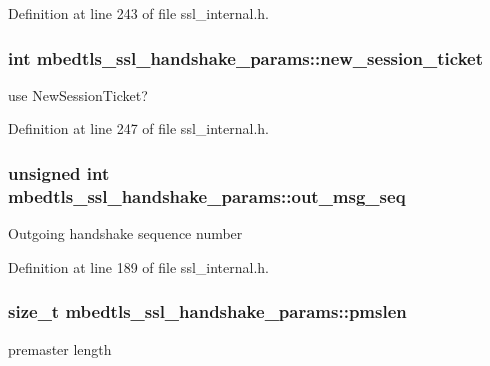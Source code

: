 Definition at line 243 of file ssl\-\_\-internal.\-h.

\hypertarget{structmbedtls__ssl__handshake__params_a576d0c2cbfd8b226f9def975403376ce}{
\subsubsection[{new\-\_\-session\-\_\-ticket}]{\setlength{\rightskip}{0pt plus 5cm}int mbedtls\-\_\-ssl\-\_\-handshake\-\_\-params\-::new\-\_\-session\-\_\-ticket}}\label{structmbedtls__ssl__handshake__params_a576d0c2cbfd8b226f9def975403376ce}
use New\-Session\-Ticket? 

Definition at line 247 of file ssl\-\_\-internal.\-h.

\hypertarget{structmbedtls__ssl__handshake__params_a5dd64f971dd0b4b43828e264117304d0}{
\subsubsection[{out\-\_\-msg\-\_\-seq}]{\setlength{\rightskip}{0pt plus 5cm}unsigned int mbedtls\-\_\-ssl\-\_\-handshake\-\_\-params\-::out\-\_\-msg\-\_\-seq}}\label{structmbedtls__ssl__handshake__params_a5dd64f971dd0b4b43828e264117304d0}
Outgoing handshake sequence number 

Definition at line 189 of file ssl\-\_\-internal.\-h.

\hypertarget{structmbedtls__ssl__handshake__params_afe09d4bb37384dbb6aa6d77f1fa38449}{
\subsubsection[{pmslen}]{\setlength{\rightskip}{0pt plus 5cm}size\-\_\-t mbedtls\-\_\-ssl\-\_\-handshake\-\_\-params\-::pmslen}}\label{structmbedtls__ssl__handshake__params_afe09d4bb37384dbb6aa6d77f1fa38449}
premaster length 

